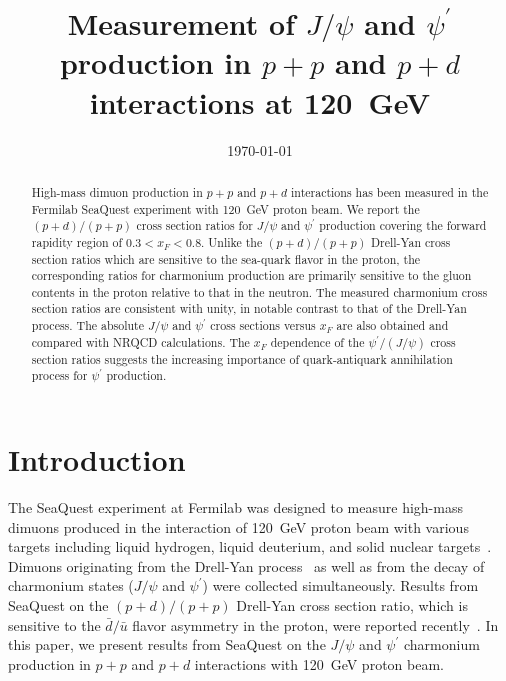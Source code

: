 \documentclass[reprint,aps,unsortedaddress,superscriptaddress,prl,floatfix,showpacs,linenumbers]{revtex4-2}
\begin{document}
\title{Measurement of $J/\psi$ and $\psi^\prime$ production in $p+p$ and
	$p+d$ interactions at \SI{120}{\GeV}}

\date{\today}

\begin{abstract}
	High-mass dimuon production in $p+p$ and $p+d$ interactions has been measured
	in the Fermilab SeaQuest experiment with \SI{120}{\GeV} proton beam.
	We report the $(p+d) / (p+p)$ cross section
	ratios for $J/\psi$ and $\psi^\prime$ production covering the forward
	rapidity region of $0.3 < x_F <0.8$. Unlike the
	$(p+d) / (p+p)$ Drell-Yan cross section ratios which are
	sensitive to the sea-quark flavor in the proton, the corresponding
	ratios for charmonium production are primarily
	sensitive to the gluon contents in the proton relative to that in the
	neutron. The measured charmonium cross section ratios are consistent with
	unity, in notable contrast to that of the Drell-Yan process.
	The absolute $J/\psi$ and
	$\psi^\prime$ cross sections versus $x_F$
	are also obtained and compared with NRQCD calculations. The $x_F$ dependence
	of the $\psi^\prime / (J/\psi)$ cross section ratios suggests the increasing
	importance of quark-antiquark annihilation process for $\psi^\prime$
	production.
\end{abstract}


\maketitle

\section{Introduction}

The SeaQuest experiment at Fermilab was designed to measure high-mass dimuons
produced in the interaction of \SI{120}{\GeV} proton beam with various targets
including liquid hydrogen, liquid deuterium, and solid nuclear
targets~\cite{aidala2019}. Dimuons
originating from the Drell-Yan process~\cite{drell1970} as well as from the
decay of charmonium
states ($J/\psi$ and $\psi^\prime$) were collected simultaneously.
Results from SeaQuest on the $(p+d) / (p+p)$ Drell-Yan cross section ratio,
which is sensitive
to the $\bar d / \bar u$ flavor asymmetry in the proton, were reported
recently~\cite{dove2021,dove2023}. In this paper, we present results from
SeaQuest on the $J/\psi$ and $\psi^\prime$ charmonium production in $p+p$
and $p+d$ interactions with \SI{120}{\GeV} proton beam.
\end{document}
